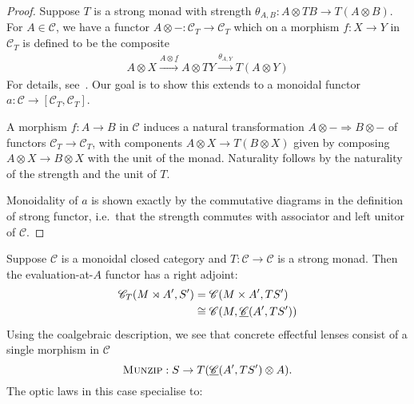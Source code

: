 \documentclass[11pt,letterpaper]{article}
\theoremstyle{plain}
\theoremstyle{definition}
\newcommand{\C}{\mathscr{C}}
\newcommand{\homC}{\underline{\C}}
\newcommand{\munzip}{\textsc{Munzip}}
\newcommand{\todo}[1]{\textcolor{red}{\small #1}}
\begin{document}
\begin{proof}
Suppose $T$ is a strong monad with strength $\theta_{A, B} : A \otimes T B \to T(A \otimes B)$. For $A \in \C$, we have a functor $A \otimes - : \C_T \to \C_T$ which on a morphism $f : X \to Y$ in $\C_T$ is defined to be the composite
\begin{align*}
A \otimes X \xrightarrow{A \otimes \underline{f}} A \otimes TY \xrightarrow{\theta_{A, Y}} T(A \otimes Y)
\end{align*}
For details, see~\cite[Theorem 4.2]{PremonoidalCategories}. Our goal is to show this extends to a monoidal functor $a : \C \to [\C_T, \C_T]$.

A morphism $f : A \to B$ in $\C$ induces a natural transformation $A \otimes - \Rightarrow B \otimes -$ of functors $\C_T \to \C_T$, with components $A \otimes X \to T(B \otimes X)$ given by composing $A \otimes X \to B \otimes X$ with the unit of the monad. Naturality follows by the naturality of the strength and the unit of $T$.

Monoidality of $a$ is shown exactly by the commutative diagrams in the definition of strong functor, i.e.\ that the strength commutes with associator and left unitor of $\C$.

\end{proof}

Suppose $\C$ is a monoidal closed category and $T : \C \to \C$ is a strong monad. Then the evaluation-at-$A$ functor has a right adjoint:
\begin{align*}
\C_T(M \monact A', S')
&= \C(M \times A', T S') \\
&\cong \C(M, \homC(A', T S'))
\end{align*}
Using the coalgebraic description, we see that concrete effectful lenses consist of a single morphism in $\C$ \[\munzip : S \to T(\homC(A', T S') \otimes A).\] The optic laws in this case specialise to:
\end{document}
